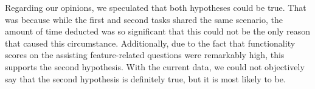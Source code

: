 Regarding our opinions, we speculated that both hypotheses could be true. That was because while the first and second tasks shared the same scenario, the amount of time deducted was so significant that this could not be the only reason that caused this circumstance. Additionally, due to the fact that functionality scores on the assisting feature-related questions were remarkably high, this supports the second hypothesis. With the current data, we could not objectively say that the second hypothesis is definitely true, but it is most likely to be.








